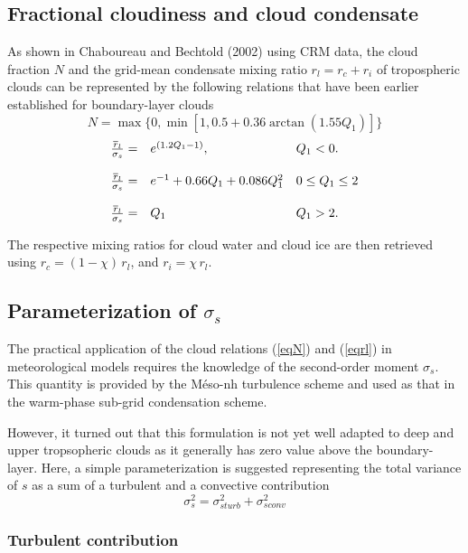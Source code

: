 \subsection{Fractional cloudiness and cloud condensate}
As shown in Chaboureau and Bechtold (2002) using CRM data,
the cloud fraction $N$ and the
grid-mean condensate mixing ratio $r_l=r_c+r_i$ of tropospheric clouds
can be represented by the
following relations that have been earlier established for boundary-layer clouds
\begin{equation}
N =\max \{0, \min [1, 0.5 + 0.36 \arctan (1.55 Q_1)]\}
\label{eqN}
\end{equation}
\begin{equation}
\begin{array}{lll}
{\overline{r}_l\over\sigma_s}  = & e^{( 1.2Q_1-1 )}, & Q_1< 0. \\
& & \\
{\overline{r}_l\over\sigma_s}  = & e^{-1}+0.66 Q_1 +0.086Q_1^2 &0\le Q_1\le 2\\
& & \\
{\overline{r}_l\over\sigma_s}  = & Q_1 &Q_1>2.\\
\end{array}
\label{eqrl}
\end{equation}

The respective mixing ratios for cloud water and cloud ice  are then retrieved
using $r_c=(1-\chi)\,r_l$, and $r_i=\chi\,r_l$.

\subsection{Parameterization of $\sigma_s$}

The practical application of the cloud relations (\ref{eqN}) and (\ref{eqrl})
in meteorological models requires the knowledge of the second-order moment
$\sigma_s$. This quantity is provided by the M\'eso-nh turbulence scheme and used
as that in the warm-phase sub-grid condensation scheme.

However, it turned out that this formulation is not yet well adapted
to deep and upper tropsopheric clouds as it generally has zero value above
the boundary-layer.
Here, a simple parameterization is suggested representing the total variance of $s$
as a sum of a turbulent and  a convective contribution
\begin{equation}
\sigma_s^2=\sigma_{sturb}^2+\sigma_{sconv}^2
\end{equation}

\subsubsection{Turbulent contribution}

